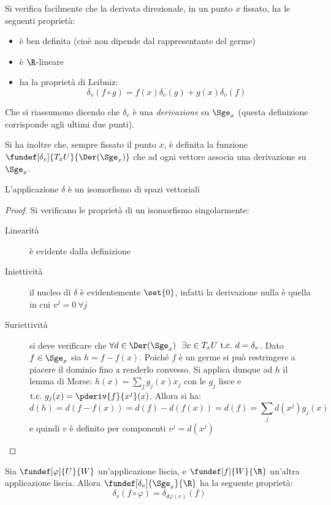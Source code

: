 \begin{oss}
Si verifica facilmente che la derivata direzionale, in un punto $x$ fissato, ha le seguenti proprietà:
\begin{itemize}
\item è ben definita (cioè non dipende dal rappresentante del germe)
\item è $\R$-lineare
\item ha la proprietà di Leibniz:
\begin{equation*}
\delta_v(f\circ g) = f(x)\delta_v(g) + g(x)\delta_v(f)
\end{equation*}
\end{itemize}
Che si riassumono dicendo che $\delta_v$ è una \emph{derivazione} su $\Sge_x$ (questa definizione corrisponde agli ultimi due punti).
\end{oss}

Si ha inoltre che, sempre fissato il punto $x$, è definita la funzione $\fundef[\delta_v]{T_x U}{\Der(\Sge_x)}$ che ad ogni vettore associa una derivazione su $\Sge_x$.

\begin{lemma}
L'applicazione $\delta$ è un isomorfismo di spazi vettoriali
\end{lemma}
\begin{proof}
Si verificano le proprietà di un isomorfismo singolarmente:
\begin{description}
\item[Linearità] è evidente dalla definizione
\item[Iniettività] il nucleo di $\delta$ è evidentemente $\set{0}$, infatti la derivazione nulla è quella in cui $v^j = 0~ \forall j$
\item[Suriettività] si deve verificare che $\forall d\in \Der(\Sge_x)\ \ \exists v\in T_x U\ \text{t.c.}\ d = \delta_v$. Dato $f\in \Sge_x$ sia $h = f -f(x)$. Poiché $f$ è un germe si può restringere a piacere il dominio fino a renderlo convesso. Si applica dunque ad $h$ il lemma di Morse: $h(x) = \sum_j g_j(x)x_j$ con le $g_j$ lisce e $\text{t.c.}\ g_j(x) = \pderiv{f}{x^j}(x)$. Allora si ha:
\begin{equation*}
d(h) = d(f - f(x)) = d(f) - d(f(x)) = d(f) = \sum_jd(x^j)g_j(x) 
\end{equation*}
e quindi $v$ è definito per componenti $v^j = d(x^j)$
\end{description}
\end{proof}

\begin{oss}
Sia $\fundef[\varphi]{U}{W}$ un'applicazione liscia, e $\fundef[f]{W}{\R}$ un'altra applicazione liscia. Allora $\fundef[\delta_v]{\Sge_x}{\R}$ ha la seguente proprietà:
\begin{equation*}
\delta_v(f\circ \varphi) = \delta_{d\varphi (v)}(f)
\end{equation*}
\end{oss}


